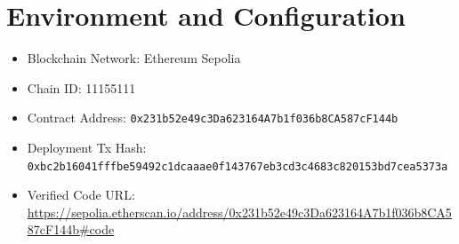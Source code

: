 \documentclass[12pt,a4paper]{article}
\begin{document}
\section{Environment and Configuration}
\begin{itemize}[leftmargin=*]
    \item Blockchain Network: Ethereum Sepolia
    \item Chain ID: 11155111
    \item Contract Address: \texttt{0x231b52e49c3Da623164A7b1f036b8CA587cF144b}
    \item Deployment Tx Hash: \texttt{0xbc2b16041fffbe59492c1dcaaae0f143767eb3cd3c4683c820153bd7cea5373a}
    \item Verified Code URL: \url{https://sepolia.etherscan.io/address/0x231b52e49c3Da623164A7b1f036b8CA587cF144b#code}
\end{itemize}
\end{document}

